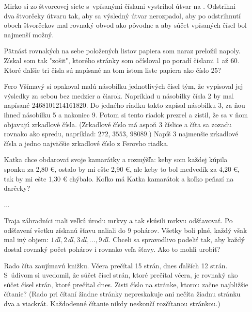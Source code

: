 {%
Mirko si zo štvorcovej siete s~vpísanými číslami vystrihol útvar na \obr{}.
Odstrihni dva štvorčeky útvaru tak, aby sa výsledný útvar
nerozpadol, aby po odstrihnutí oboch štvorčekov mal
rovnaký obvod ako pôvodne a aby súčet vpísaných čísel bol
najmenší možný.
%
}

{%
Pätnásť rovnakých na sebe položených listov papiera som naraz preložil napoly.
Získal som tak "zošit", ktorého stránky som očísloval po poradí číslami 1 až 60. Ktoré
ďalšie tri čísla sú napísané na tom istom liste papiera ako číslo 25?}

{%
Fero Všímavý si opakoval malú násobilku jednotlivých čísel tým, že vypisoval jej
výsledky za sebou bez medzier a čiarok. Napríklad u násobilky čísla 2 by mal
napísané $2468101214161820$. Do jedného riadku takto zapísal násobilku 3, za ňou
ihneď násobilku 5 a nakoniec 9. Potom si tento riadok prezrel a zistil, že sa v ňom
objavujú zrkadlové čísla. (Zrkadlové číslo má aspoň 3 číslice a číta sa zozadu
rovnako ako spredu, napríklad: $272$, $3553$, $98089$.) Napíš 3 najmenšie zrkadlové
čísla a jedno najväčšie zrkadlové číslo z Ferovho riadka.}

{%
Katka chce obdarovať svoje kamarátky a rozmýšľa: keby som každej kúpila sponku
za 2{,}80 €, ostalo by mi ešte 2{,}90 €, ale keby to bol medvedík za 4{,}20 €, tak by mi
ešte 1{,}30 € chýbalo. Koľko má Katka kamarátok a koľko peňazí na darčeky?}

{%
...}

{%
Traja záhradníci mali veľkú úrodu mrkvy a tak skúsili mrkvu odšťavovať. Po
odšťavení všetku získanú šťavu naliali do 9 pohárov. Všetky boli plné, každý však
mal iný objem: $1\,dl, 2\,dl, 3\,dl, \dots, 9\,dl$. Chceli sa spravodlivo podeliť tak, aby každý
dostal rovnaký počet pohárov i rovnako veľa šťavy. Ako to mohli urobiť?}

{%
Rado číta zaujímavú knižku. Včera prečítal 15 strán, dnes ďalších 12 strán. S~údivom
si uvedomil, že súčet čísel strán, ktoré prečítal včera, je rovnaký ako súčet čísel
strán, ktoré prečítal dnes. Zisti číslo na stránke, ktorou začne najbližšie čítanie?
(Rado pri čítaní žiadne stránky nepreskakuje ani nečíta žiadnu stránku dva a
viackrát. Každodenné čítanie nikdy neskončí rozčítanou stránkou.)}

